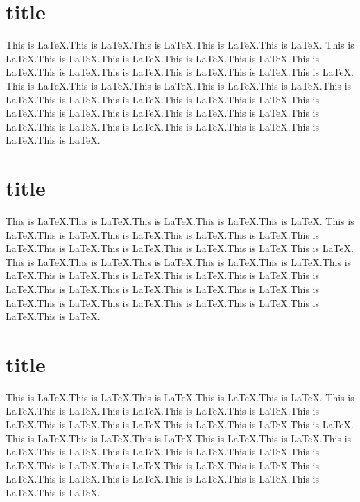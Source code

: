 \documentclass{book}
\begin{document}
\section{title}
This is LaTeX.This is LaTeX.This is LaTeX.This is LaTeX.This is LaTeX.
This is LaTeX.This is LaTeX.This is LaTeX.This is LaTeX.This is LaTeX.This is LaTeX.This is LaTeX.This is LaTeX.This is LaTeX.This is LaTeX.This is LaTeX.
This is LaTeX.This is LaTeX.This is LaTeX.This is LaTeX.This is LaTeX.This is LaTeX.This is LaTeX.This is LaTeX.This is LaTeX.This is LaTeX.This is LaTeX.This is LaTeX.This is LaTeX.This is LaTeX.This is LaTeX.This is LaTeX.This is LaTeX.This is LaTeX.This is LaTeX.This is LaTeX.This is LaTeX.This is LaTeX.

\section{title}
This is LaTeX.This is LaTeX.This is LaTeX.This is LaTeX.This is LaTeX.
This is LaTeX.This is LaTeX.This is LaTeX.This is LaTeX.This is LaTeX.This is LaTeX.This is LaTeX.This is LaTeX.This is LaTeX.This is LaTeX.This is LaTeX.
This is LaTeX.This is LaTeX.This is LaTeX.This is LaTeX.This is LaTeX.This is LaTeX.This is LaTeX.This is LaTeX.This is LaTeX.This is LaTeX.This is LaTeX.This is LaTeX.This is LaTeX.This is LaTeX.This is LaTeX.This is LaTeX.This is LaTeX.This is LaTeX.This is LaTeX.This is LaTeX.This is LaTeX.This is LaTeX.

\section{title}
This is LaTeX.This is LaTeX.This is LaTeX.This is LaTeX.This is LaTeX.
This is LaTeX.This is LaTeX.This is LaTeX.This is LaTeX.This is LaTeX.This is LaTeX.This is LaTeX.This is LaTeX.This is LaTeX.This is LaTeX.This is LaTeX.
This is LaTeX.This is LaTeX.This is LaTeX.This is LaTeX.This is LaTeX.This is LaTeX.This is LaTeX.This is LaTeX.This is LaTeX.This is LaTeX.This is LaTeX.This is LaTeX.This is LaTeX.This is LaTeX.This is LaTeX.This is LaTeX.This is LaTeX.This is LaTeX.This is LaTeX.This is LaTeX.This is LaTeX.This is LaTeX.
\end{document}
